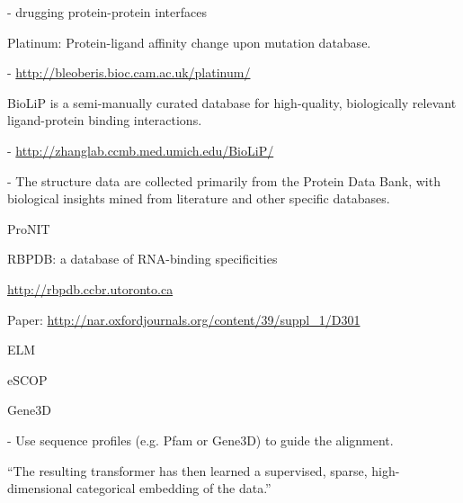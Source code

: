 - drugging protein-protein interfaces \cite{wells_reaching_2007}

Platinum: Protein-ligand affinity change upon mutation database.

- \url{http://bleoberis.bioc.cam.ac.uk/platinum/}

BioLiP is a semi-manually curated database for high-quality, biologically relevant ligand-protein binding interactions.

- \url{http://zhanglab.ccmb.med.umich.edu/BioLiP/}

- The structure data are collected primarily from the Protein Data Bank, with biological insights mined from literature and other specific databases.


ProNIT

RBPDB: a database of RNA-binding specificities

\url{http://rbpdb.ccbr.utoronto.ca}

Paper: \url{http://nar.oxfordjournals.org/content/39/suppl_1/D301}


ELM




eSCOP

Gene3D

- Use sequence profiles (e.g. Pfam or Gene3D) to guide the alignment.

``The resulting transformer has then learned a supervised, sparse, high-dimensional categorical embedding of the data.''

